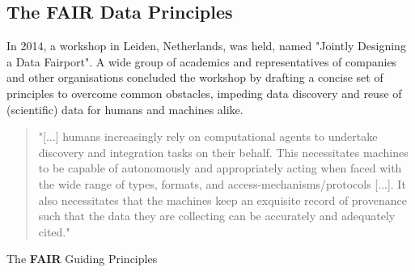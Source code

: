 \documentclass[a4paper,english,twoside,BCOR1.5cm,headsepline,DIV12,appendixprefix,final,12pt]{scrbook}
\begin{document}
\pagebreak
\subsection{The FAIR Data Principles}
\label{sec:fair}

In 2014, a workshop in Leiden, Netherlands, was held, named "Jointly Designing a Data Fairport". A wide group of academics and representatives of companies and other organisations concluded the workshop by drafting a concise set of principles to overcome common obstacles, impeding data discovery and reuse of (scientific) data for humans and machines alike.

\begin{quote}
"[...] humans increasingly rely on computational
agents to undertake discovery and integration tasks on their behalf. This necessitates machines to be capable of autonomously and appropriately acting when faced with the wide range of types, formats, and access-mechanisms/protocols [...]. It also necessitates that the machines keep an exquisite record of provenance such that the data they are collecting can be accurately and adequately cited." \cite{fair2016}
\end{quote}


The \textbf{FAIR} Guiding Principles \cite{fair2016}
\end{document}
